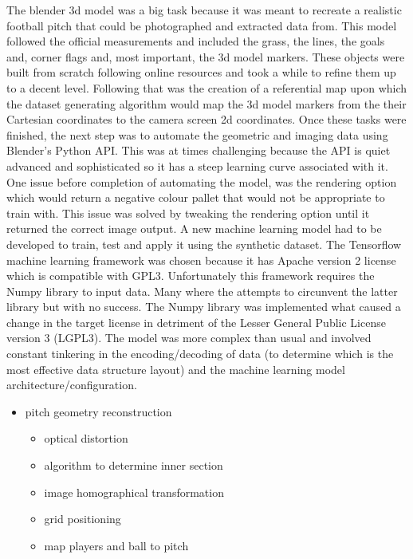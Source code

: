 \documentclass[
11pt,
twoside
]{report}
\begin{document}
The blender 3d model was a big task because it was meant to recreate a realistic football pitch that could be photographed and extracted data from. This model followed the official measurements and included the grass, the lines, the goals and, corner flags and, most important, the 3d model markers. These objects were built from scratch following online resources and took a while to refine them up to a decent level. Following that was the creation of a referential map upon which the dataset generating algorithm would map the 3d model markers from the their Cartesian coordinates to the camera screen 2d coordinates. Once these tasks were finished, the next step was to automate the geometric and imaging data using Blender's Python API. This was at times challenging because the API is quiet advanced and sophisticated so it has a steep learning curve associated with it. One issue before completion of automating the model, was the rendering option which would return a negative colour pallet that would not be appropriate to train with. This issue was solved by tweaking the rendering option until it returned the correct image output.
A new machine learning model had to be developed to train, test and apply it using the synthetic dataset. The Tensorflow machine learning framework was chosen because it has Apache version 2 license which is compatible with GPL3. Unfortunately this framework requires the Numpy library to input data. Many where the attempts to circunvent the latter library but with no success. The Numpy library was implemented what caused a change in the target license in detriment of the Lesser General Public License version 3 (LGPL3). The model was more complex than usual and involved constant tinkering in the encoding/decoding of data (to determine which is the most effective data structure layout) and the machine learning model architecture/configuration.


\begin{itemize}
\item
  pitch geometry reconstruction

  \begin{itemize}
  \item
    optical distortion
  \item
    algorithm to determine inner section
  \item
    image homographical transformation
  \item
    grid positioning
  \item
    map players and ball to pitch
  \end{itemize}
\end{itemize}
\end{document}
